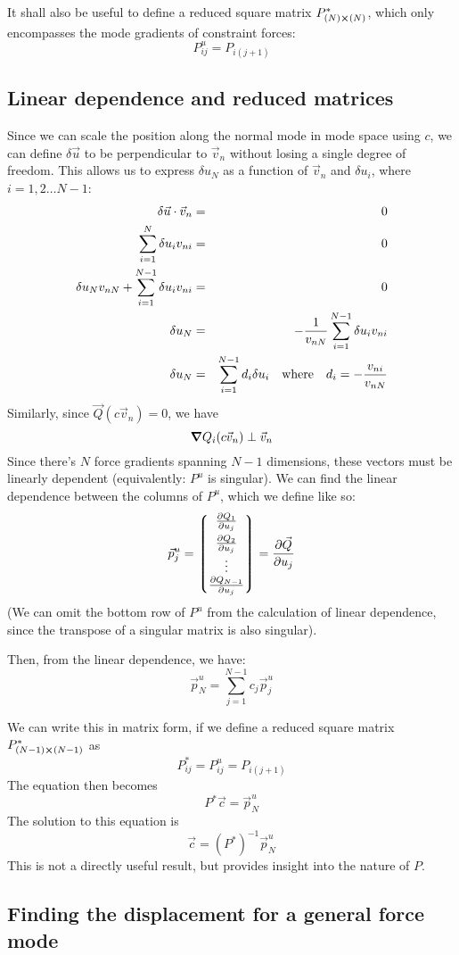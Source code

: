 \documentclass[12pt]{article}
\begin{document}
  It shall also be useful to define a reduced square matrix $P_{(N)\cross (N)}^*$, which only encompasses the mode gradients of constraint forces:
  $$P_{ij}^u = P_{i(j+1)}$$
  
  \subsection{Linear dependence and reduced matrices}
  Since we can scale the position along the normal mode in mode space using $c$, we can define $\delta\vec{u}$ to be perpendicular to $\vec{v}_n$ without losing a single degree of freedom. This allows us to express $\delta u_N$ as a function of $\vec{v}_n$ and $\delta u_i$, where $i=1, 2\dots N-1$:
  \begin{eqnarray}
  \delta\vec{u}\cdot \vec{v}_n &=& 0\\
  \sum_{i=1}^N \delta u_i v_{ni} &=&0\\
  \delta u_N v_{nN} + \sum_{i=1}^{N-1} \delta u_i v_{ni} &=& 0\\
  \delta u_N &=& -\frac{1}{v_{nN}} \sum_{i=1}^{N-1} \delta u_i v_{ni}\\
  \delta u_N &=& \sum_{i=1}^{N-1} d_i \delta u_i\qq{where} d_i = -\frac{v_{ni}}{v_{nN}}
  \end{eqnarray}
  Similarly, since $\vec{Q}(c\vec{v}_n)=0$, we have
  $$\grad Q_i(c\vec{v}_n) \perp \vec{v}_n$$
  Since there's $N$ force gradients spanning $N-1$ dimensions, these vectors must be linearly dependent (equivalently: $P^u$ is singular). We can find the linear dependence between the columns of $P^u$, which we define like so:
  $$\vec{p}_j^u = \mqty*( \pdv{Q_1}{u_j} \\[5pt] \pdv{Q_2}{u_j} \\ \vdots \\ \pdv{Q_{N-1}}{u_j}) = \pdv{\vec{Q}}{u_j}$$
  (We can omit the bottom row of $P^u$ from the calculation of linear dependence, since the transpose of a singular matrix is also singular).
  
  Then, from the linear dependence, we have:
  $$\vec{p}_N^u=\sum_{j=1}^{N-1} c_j \vec{p}_j^u$$
  
  We can write this in matrix form, if we define a reduced square matrix $P_{(N-1)\cross (N-1)}^*$ as
  $$P_{ij}^*=P_{ij}^u=P_{i(j+1)}$$
  The equation then becomes
  $$P^* \vec{c} = \vec{p}_N^u$$
  The solution to this equation is
  $$\vec{c} = (P^*)^{-1} \vec{p}_N^u$$
  This is not a directly useful result, but provides insight into the nature of $P$.
  
  \subsection{Finding the displacement for a general force mode}
  
\end{document}
